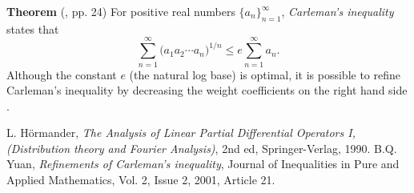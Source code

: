 \documentclass[12pt]{article}
\begin{document}
{\bf Theorem} (\cite{hormander}, pp. 24)
For positive real numbers $\{a_n\}_{n=1}^\infty$,
\emph{Carleman's inequality} states that
$$ \sum_{n=1}^\infty \big(a_1 a_2 \cdots a_n\big)^{1/n} \le e \sum_{n=1}^\infty
a_n.$$
Although the constant $e$ (the natural log base)
is optimal, it is possible to refine
Carleman's inequality by decreasing the weight coefficients
on the right hand side \cite{yuan}.


\begin{thebibliography}{9}
L. H\"ormander, \emph{The Analysis of Linear Partial Differential Operators I,
(Distribution theory and Fourier Analysis)}, 2nd ed, Springer-Verlag, 1990.
B.Q. Yuan, \emph{Refinements of Carleman's inequality},
Journal of Inequalities in Pure and Applied Mathematics, Vol. 2, Issue 2, 2001,
Article 21. 
 \end{thebibliography}
\end{document}

